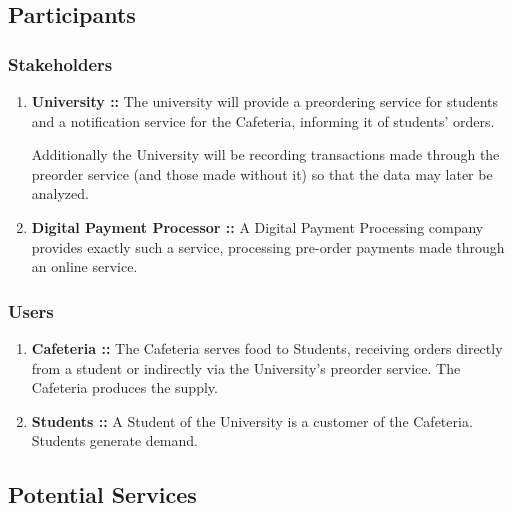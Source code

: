 \documentclass[11pt]{article}
\begin{document}
\subsection{Participants}
\label{sec:org8590530}

\subsubsection{Stakeholders}
\label{sec:orga18f928}
\begin{enumerate}
\item \textbf{University ::}
\label{sec:org0212f64}
The university will provide a preordering service for students
and a notification service for the Cafeteria, informing it of
students' orders.

Additionally the University will be recording transactions made
through the preorder service (and those made without it) so that
the data may later be analyzed.
\item \textbf{Digital Payment Processor ::}
\label{sec:org6ad8f9f}
A Digital Payment Processing company provides exactly such a
service, processing pre-order payments made through an online
service.
\end{enumerate}
\subsubsection{Users}
\label{sec:orgaa2e37c}
\begin{enumerate}
\item \textbf{Cafeteria ::}
\label{sec:org9500b49}
The Cafeteria serves food to Students, receiving orders directly
from a student or indirectly via the University's preorder
service. The Cafeteria produces the supply.
\item \textbf{Students ::}
\label{sec:org531929c}
A Student of the University is a customer of the
Cafeteria. Students generate demand.
\end{enumerate}
\subsection{Potential Services}
\label{sec:org008c3fb}
\end{document}
